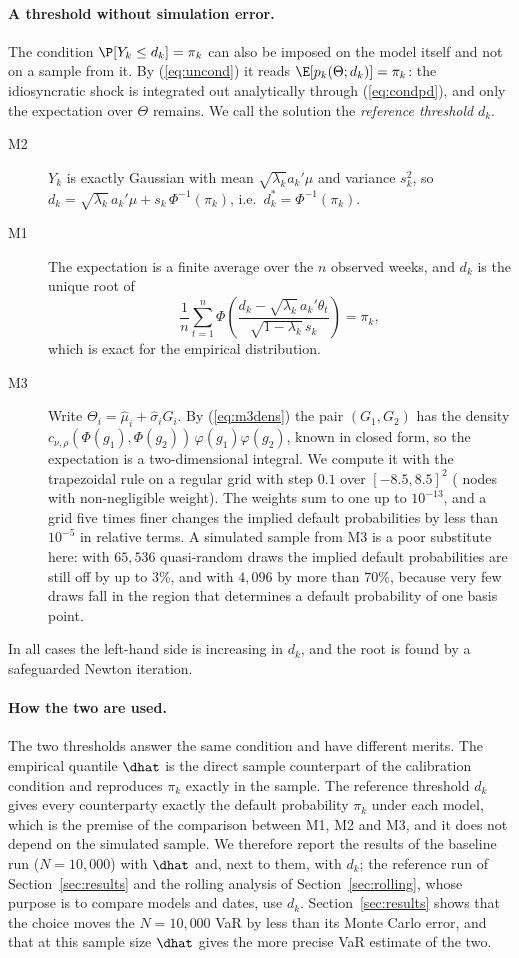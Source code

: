 \paragraph{A threshold without simulation error.}
The condition $\P[Y_k\le d_k]=\pi_k$ can also be imposed on the model itself and not on a sample from it. By (\ref{eq:uncond}) it reads $\E[p_k(\Theta;d_k)]=\pi_k$: the idiosyncratic shock is integrated out analytically through (\ref{eq:condpd}), and only the expectation over $\Theta$ remains. We call the solution the \emph{reference threshold} $d_k$.
\begin{description}
\item[M2] $Y_k$ is exactly Gaussian with mean $\sqrt{\lambda_k}a_k'\mu$ and variance $s_k^2$, so $d_k=\sqrt{\lambda_k}\,a_k'\mu+s_k\,\Phi^{-1}(\pi_k)$, i.e.\ $d_k^*=\Phi^{-1}(\pi_k)$.
\item[M1] The expectation is a finite average over the $n$ observed weeks, and $d_k$ is the unique root of
\[
\frac1n\sum_{t=1}^n\Phi\!\left(\frac{d_k-\sqrt{\lambda_k}\,a_k'\theta_t}{\sqrt{1-\lambda_k}\,s_k}\right)=\pi_k ,
\]
which is exact for the empirical distribution.
\item[M3] Write $\Theta_i=\hat\mu_i+\hat\sigma_iG_i$. By (\ref{eq:m3dens}) the pair $(G_1,G_2)$ has the density $c_{\nu,\rho}(\Phi(g_1),\Phi(g_2))\,\varphi(g_1)\varphi(g_2)$, known in closed form, so the expectation is a two-dimensional integral. We compute it with the trapezoidal rule on a regular grid with step $0.1$ over $[-8.5,8.5]^2$ ( nodes with non-negligible weight). The weights sum to one up to $10^{-13}$, and a grid five times finer changes the implied default probabilities by less than $10^{-5}$ in relative terms. A simulated sample from M3 is a poor substitute here: with $65{,}536$ quasi-random draws the implied default probabilities are still off by up to 3\%, and with $4{,}096$ by more than 70\%, because very few draws fall in the region that determines a default probability of one basis point.
\end{description}
In all cases the left-hand side is increasing in $d_k$, and the root is found by a safeguarded Newton iteration.

\paragraph{How the two are used.}
The two thresholds answer the same condition and have different merits. The empirical quantile $\dhat$ is the direct sample counterpart of the calibration condition and reproduces $\pi_k$ exactly in the sample. The reference threshold $d_k$ gives every counterparty exactly the default probability $\pi_k$ under each model, which is the premise of the comparison between M1, M2 and M3, and it does not depend on the simulated sample. We therefore report the results of the baseline run ($N=10{,}000$) with $\dhat$ and, next to them, with $d_k$; the reference run of Section~\ref{sec:results} and the rolling analysis of Section~\ref{sec:rolling}, whose purpose is to compare models and dates, use $d_k$. Section~\ref{sec:results} shows that the choice moves the $N=10{,}000$ VaR by less than its Monte Carlo error, and that at this sample size $\dhat$ gives the more precise VaR estimate of the two.

